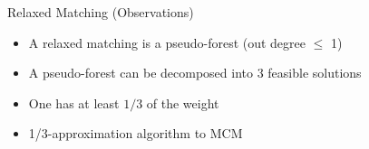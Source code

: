 \begin{frame}{Relaxed Matching (Observations)}
\begin{itemize}
  \item A relaxed matching is a pseudo-forest (out degree $\leq$ 1)
  \item A pseudo-forest can be decomposed into 3 feasible solutions
  \item One has at least $1/3$ of the weight 
  \item 1/3-approximation algorithm to MCM
\end{itemize}
\centering

\end{frame}
